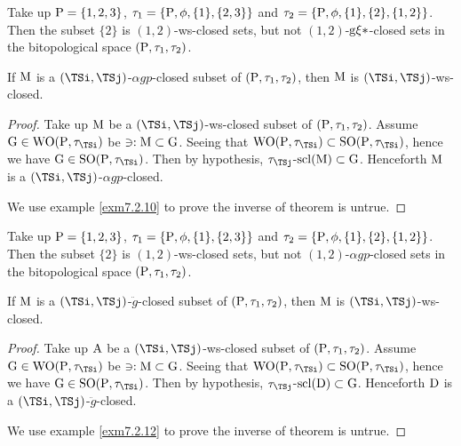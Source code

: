 \begin{exm}\label{exm7.2.8} 
Take up $\mathrm{P}= \{1,2,3\}$, $\tau_1 =\{\mathrm{P}, \phi, \{1\}, \{2,3\}\}$ and $\tau_2 =\{\mathrm{P}, \phi, \{1\}, \{2\}, \{1, 2\}\}$. Then the subset $\{2\}$ is $(1, 2)$-ws-closed sets, but not $(1, 2)$-$\mathrm{g}\xi*$-closed sets in the bitopological space $(\mathrm{P}, \tau_1 , \tau_2 )$.
\end{exm}

\begin{thm}\label{thm7.2.9}
If $\mathrm{M}$ is a $(\TSi, \TSj)$-$\alpha gp$-closed subset of $(\mathrm{P}, \tau_1 , \tau_2)$, then $\mathrm{M}$ is $(\TSi, \TSj)$-ws-closed.
\end{thm}

\begin{proof}
Take up $\mathrm{M}$ be a $(\TSi, \TSj)$-ws-closed subset of $(\mathrm{P}, \tau_1 , \tau_2)$. Assume $\TSG\in\TSW\TSO(\TSP, \tau_{\TSi})$ be $\ni: \mathrm{M} \subset \mathrm{G}$. Seeing that $\TSW\TSO(\TSP, \tau_{\TSi}) \subset \TSS\TSO(\TSP, \tau_{\TSi})$, hence we have $\TSG\in\TSS\TSO(\TSP, \tau_{\TSi})$. Then by hypothesis, $\tau_{\TSj}$-$
\mathrm{scl}(\mathrm{M}) \subset \mathrm{G}$. Henceforth $\mathrm{M}$ is a $(\TSi, \TSj)$-$\alpha gp$-closed.

We use example \ref{exm7.2.10} to prove the inverse of theorem is untrue.
\end{proof}

\begin{exm}\label{exm7.2.10}
Take up $\mathrm{P}= \{1,2,3\}$, $\tau_1 =\{\mathrm{P}, \phi, \{1\}, \{2,3\}\}$ and $\tau_2 =\{\mathrm{P}, \phi, \{1\}, \{2\}, \{1, 2\}\}$. Then the subset $\{2\}$ is $(1, 2)$-ws-closed sets, but not $(1, 2)$-$\alpha gp$-closed sets in the bitopological space $(\mathrm{P}, \tau_1 , \tau_2 )$.
\end{exm}

\begin{thm}\label{thm7.2.11}
If $\mathrm{M}$ is a $(\TSi, \TSj)$-$\ddot{g}$-closed subset of $(\mathrm{P}, \tau_1 , \tau_2)$, then $\mathrm{M}$ is $(\TSi, \TSj)$-ws-closed.
\end{thm}

\begin{proof}
Take up $\mathrm{A}$ be a $(\TSi, \TSj)$-ws-closed subset of $(\mathrm{P}, \tau_1 , \tau_2 )$. Assume $\TSG\in\TSW\TSO(\TSP, \tau_{\TSi} )$ be $\ni: \mathrm{M} \subset \mathrm{G}$. Seeing that $\TSW\TSO(\TSP, \tau_{\TSi} ) \subset \TSS\TSO(\TSP, \tau_{\TSi} )$, hence we have $\TSG\in\TSS\TSO(\TSP, \tau_{\TSi} )$. Then by hypothesis, $\tau_{\TSj}$-$\mathrm{scl}(\mathrm{D}) \subset \mathrm{G}$. Henceforth $\mathrm{D}$ is a $(\TSi, \TSj)$-$\ddot{g}$-closed.

We use example \ref{exm7.2.12} to prove the inverse of theorem is untrue.
\end{proof}

